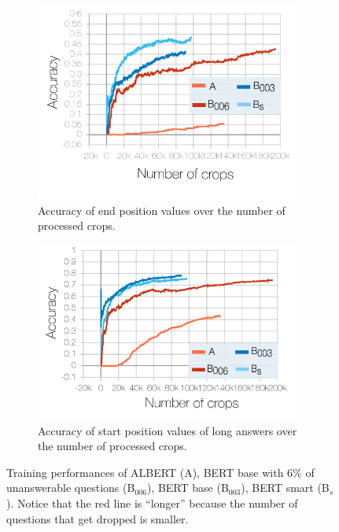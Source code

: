 \documentclass[10pt,hidelinks]{article}
\begin{document}
\begin{figure}[ht]
\begin{subfigure}[t]{.45\textwidth}
		\includegraphics[width=0.95\textwidth]{pics/acc_2_lr_005.pdf}
		\caption{Accuracy of end position values over the number of processed crops.}\label{fig:loss3}
	\end{subfigure}\hfill
	\begin{subfigure}[t]{.45\textwidth}
		\centering
		\includegraphics[width=0.95\textwidth]{pics/acc_3_lr_005.pdf}
		\caption{Accuracy of start position values of long answers over the number of processed crops.}\label{fig:loss4}
	\end{subfigure}
	\caption{Training performances of ALBERT (A), BERT base with $6\%$ of unanswerable questions (B$_006$), BERT base (B$_{003}$), BERT smart (B$_s$). Notice that the red line is ``longer'' because the number of questions that get dropped is smaller.}
	\label{fig:lr_005}
\end{figure}
\end{document}
